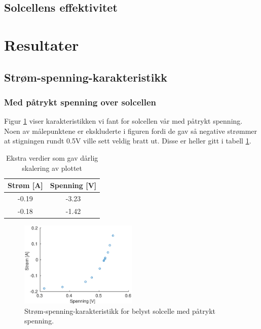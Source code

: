 \documentclass[a4paper,11pt, twocolumn]{article}
\begin{document}
\subsection{Solcellens effektivitet}
\section{Resultater}
\subsection{Strøm-spenning-karakteristikk}
\subsubsection{Med påtrykt spenning over solcellen}
Figur \ref{fig:resMedSpenning} viser karakteristikken vi fant for solcellen vår med påtrykt spenning. Noen av målepunktene er ekskluderte i figuren fordi de gav så negative strømmer at stigningen rundt 0.5V ville sett veldig bratt ut. Disse er heller gitt i tabell \ref{tab:ekstra}.

\begin{table}[!ht]
\centering
	\begin{tabular}{cc}
		\toprule
		\toprule
		Strøm [A] & Spenning [V]\\
		\hline
		-0.19 & -3.23\\
		-0.18 & -1.42\\
		\toprule
	\end{tabular}
	\caption{Ekstra verdier som gav dårlig skalering av plottet}
	\label{tab:ekstra}
\end{table}

\begin{figure}[!ht]
	\includegraphics[width = 0.5\textwidth]{matlab/LAB/belystMedSpenning.eps}
	\caption{Strøm-spenning-karakteristikk for belyst solcelle med påtrykt spenning.}
	\label{fig:resMedSpenning}
\end{figure}
\end{document}

